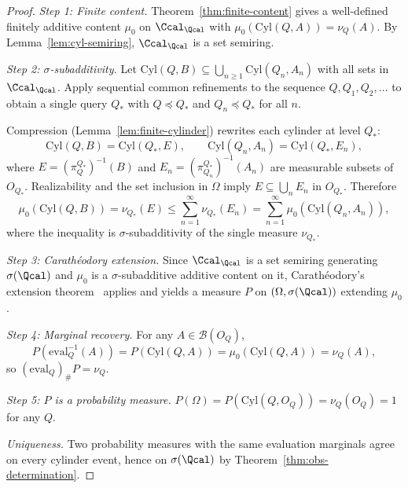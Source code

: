 \begin{proof}
\textit{Step 1: Finite content.}
Theorem~\ref{thm:finite-content} gives a well-defined finitely additive
content $\mu_0$ on $\Ccal_{\Qcal}$ with $\mu_0(\mathrm{Cyl}(Q,A))=\nu_Q(A)$.
By Lemma~\ref{lem:cyl-semiring}, $\Ccal_{\Qcal}$ is a set semiring.

\medskip
\noindent\textit{Step 2: $\sigma$-subadditivity.}
Let $\mathrm{Cyl}(Q,B)\subseteq\bigcup_{n\ge1}\mathrm{Cyl}(Q_n,A_n)$ with all
sets in $\Ccal_{\Qcal}$.  Apply sequential common refinements to the
sequence $Q,Q_1,Q_2,\ldots$ to obtain a single query $Q_*$ with
$Q\preceq Q_*$ and $Q_n\preceq Q_*$ for all $n$.

Compression (Lemma~\ref{lem:finite-cylinder}) rewrites each cylinder
at level $Q_*$:
\[
\mathrm{Cyl}(Q,B) = \mathrm{Cyl}(Q_*,E),
\qquad
\mathrm{Cyl}(Q_n,A_n) = \mathrm{Cyl}(Q_*,E_n),
\]
where $E=(\pi^{Q_*}_Q)^{-1}(B)$ and $E_n=(\pi^{Q_*}_{Q_n})^{-1}(A_n)$
are measurable subsets of $O_{Q_*}$.
Realizability and the set inclusion in $\Omega$ imply $E\subseteq\bigcup_n E_n$ in $O_{Q_*}$.
Therefore
\[
\mu_0(\mathrm{Cyl}(Q,B))
= \nu_{Q_*}(E)
\le \sum_{n=1}^\infty \nu_{Q_*}(E_n)
= \sum_{n=1}^\infty \mu_0(\mathrm{Cyl}(Q_n,A_n)),
\]
where the inequality is $\sigma$-subadditivity of the single measure $\nu_{Q_*}$.

\medskip
\noindent\textit{Step 3: Carathéodory extension.}
Since $\Ccal_{\Qcal}$ is a set semiring generating $\sigma(\Qcal)$ and
$\mu_0$ is a $\sigma$-subadditive additive content on it,
Carathéodory's extension theorem~\cite{Billingsley,Bogachev} applies
and yields a measure $P$ on $(\Omega,\sigma(\Qcal))$ extending $\mu_0$.

\medskip
\noindent\textit{Step 4: Marginal recovery.}
For any $A\in\mathcal B(O_Q)$,
\[
P(\mathrm{eval}_Q^{-1}(A))
= P(\mathrm{Cyl}(Q,A))
= \mu_0(\mathrm{Cyl}(Q,A))
= \nu_Q(A),
\]
so $(\mathrm{eval}_Q)_\# P = \nu_Q$.

\medskip
\noindent\textit{Step 5: $P$ is a probability measure.}
$P(\Omega)=P(\mathrm{Cyl}(Q,O_Q))=\nu_Q(O_Q)=1$ for any $Q$.

\medskip
\noindent\textit{Uniqueness.}
Two probability measures with the same evaluation marginals agree on
every cylinder event, hence on $\sigma(\Qcal)$ by
Theorem~\ref{thm:obs-determination}.
\end{proof}

